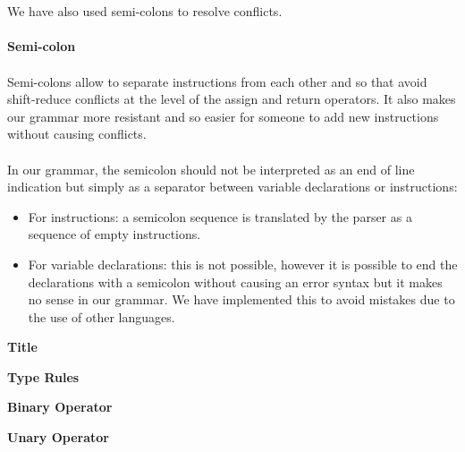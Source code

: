\documentclass[11pt]{report}
\begin{document}
\\ \\
\newpage
We have also used semi-colons to resolve conflicts. \\ \\
\tabto{2cm} \textbf{Semi-colon} \\ \\
\tabto{1cm}Semi-colons allow to separate instructions from each other and so that avoid shift-reduce conflicts at the level of the assign and return operators. It also makes our grammar more resistant and so easier for someone to add new instructions without causing conflicts. \\ \\
\tabto{1cm} In our grammar, the semicolon should not be interpreted as an end of line indication but simply as a separator between variable declarations or instructions:
\begin{itemize}
\item For instructions: a semicolon sequence is translated by the parser as a sequence of empty instructions.
\item For variable declarations: this is not possible, however it is possible to end the declarations with a semicolon without causing an error syntax but it makes no sense in our grammar. We have implemented this to avoid mistakes due to the use of other languages.
\end{itemize}

\tabto{0cm} {\Large \textbf{Title}}



\newpage
\centerline{\textbf{\Huge Type Rules}}
\vspace*{3pt}
\vspace*{20pt}


\tabto{0cm} {\large \textbf{Binary Operator}}
\begin{prooftree}
\end{prooftree}

\tabto{0cm} {\large \textbf{Unary Operator}}
\begin{prooftree}
\end{prooftree}
\end{document}
